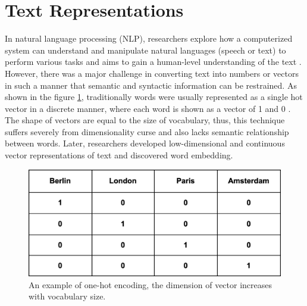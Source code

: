 \documentclass[%
	BCOR=8mm, %
	DIV=12,
	toc=bibliography, %
	toc=listof, %
	oneside, %
	egregdoesnotlikesansseriftitles, %
	]{scrbook}
\begin{document}
\section{Text Representations}
\label{section: textrep}
In natural language processing (NLP), researchers explore how a computerized system can understand and manipulate natural languages (speech or text) to perform various tasks \cite{chowdhury_natural_2003} and aims to gain a human-level understanding of the text \cite{naseem_comprehensive_2020}. However, there was a major challenge in converting text into numbers or vectors in such a manner that semantic and syntactic information can be restrained. As shown in the figure \ref{fig:onehot}, traditionally words were usually represented as a single hot vector in a discrete manner, where each word is shown as a vector of 1 and 0 \cite{salton_vector_1975}. The shape of vectors are equal to the size of vocabulary, thus, this technique suffers severely from dimensionality curse and also lacks semantic relationship between words. Later, researchers developed low-dimensional and continuous vector representations of text and discovered word embedding.
\begin{figure}[h!]
    \centering
    \includegraphics[width=0.5\linewidth]{img/onehot.png}
    \caption[Example of one-hot encoding.]{ An example of one-hot encoding, the dimension of vector increases with vocabulary size.}
    \label{fig:onehot}
\end{figure}
\end{document}
